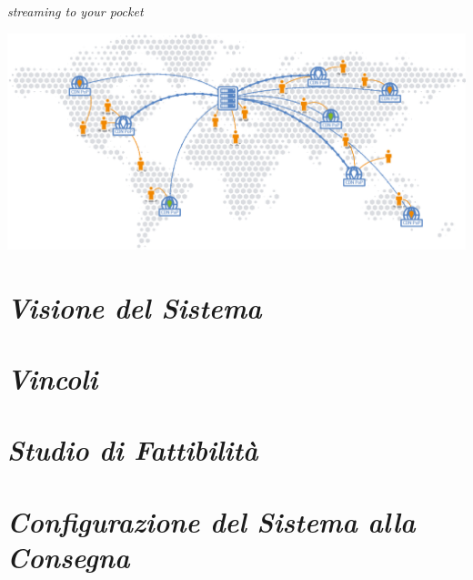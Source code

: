 \documentclass{article}
\author{Agosta, Belli, Emili, Giacchini, Luciani}
\begin{document}
\begin{center}
    \sffamily{\fontsize{50}{48} \selectfont \textcolor{red}{Nexi}\textcolor{green}{Fy}}
\end{center}

\begin{center}
    \itshape{\fontsize{20}{48} \selectfont streaming to your pocket}
\end{center}

\bigskip\bigskip\bigskip

\begin{flushleft}
    \includegraphics[scale=1]{images/worldCDN.png}
\end{flushleft}

\newpage
\printindex

\tableofcontents

\newpage
\section{\itshape{Visione del Sistema}}


\newpage
\section{\itshape{Vincoli}}


\section{\itshape{Studio di Fattibilità}}


\section{\itshape{Configurazione del Sistema alla Consegna}}

\end{document}
